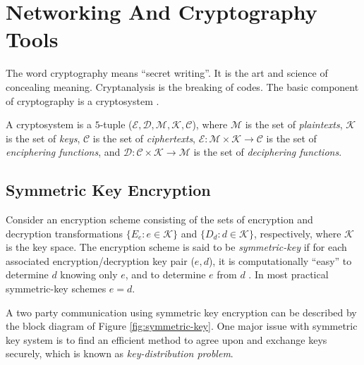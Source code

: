 \chapter{Networking And Cryptography Tools} %
\label{cha:Networking and Cryptography tools}

	The word cryptography means ``secret writing''.
	It is the art and science of concealing meaning.
	Cryptanalysis is the breaking of codes.
	The basic component of cryptography is a cryptosystem \cite{bishop2004introduction}.
	\begin{definition}
		A cryptosystem is a $5$-tuple ($ \mathcal{E,D,M,K,C}$), where $\mathcal{M}$ is the set of \textit{plaintexts}, $\mathcal{K}$ is the set of \textit{keys}, $\mathcal{C}$ is the set of \textit{ciphertexts}, $\mathcal{E}:\mathcal{M} \times \mathcal{K} \rightarrow \mathcal{C}$ is the set of \textit{enciphering functions}, and $\mathcal{D}:\mathcal{C} \times \mathcal{K} \rightarrow \mathcal{M}$ is the set of \textit{deciphering functions}.
	\end{definition}

\section{Symmetric Key Encryption}
	Consider an encryption scheme consisting of the sets of encryption and decryption transformations $\{E_{e}: e \in \mathcal{K}\}$ and $\{D_{d}: d \in \mathcal{K}\}$, respectively, where $\mathcal{K}$ is the key space.
	The encryption scheme is said to be \textit{symmetric-key} if for each associated encryption/decryption key pair ($e,d$), it is computationally ``easy'' to determine $d$ knowing only $e$, and to determine $e$ from $d$ \cite{menezes2010handbook}.
	In most practical symmetric-key schemes $e = d$.

	A two party communication using symmetric key encryption can be described by the block diagram of Figure \ref{fig:symmetric-key}. 
	One major issue with symmetric key system is to find an efficient method to agree upon and exchange keys securely, which is known as \textit{key-distribution problem}. 

